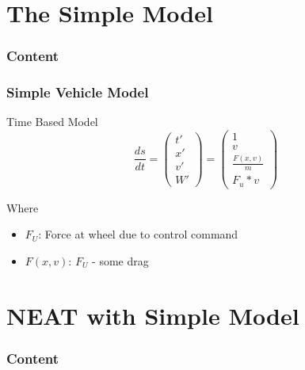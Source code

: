 \documentclass[8pt]{beamer}
\begin{document}
\section{The Simple Model}
\begin{frame}
	\frametitle{Content}
\end{frame}
\begin{frame}
	\frametitle{Simple Vehicle Model}
	\begin{block}{Time Based Model}	
	\[
	\frac{ds}{dt} = \left(
			\begin{array}{ll}
			t' \\
			x' \\
			v' \\
			W'
			\end{array}
		\right)
		= \left(
			\begin{array}{ll}
			1 \\
			v \\
			\frac{F(x,v)}{m} \\
			F_u * v
			\end{array}
		\right)
	\]
	
	Where\\
	\begin{itemize}
		\item $F_U$: Force at wheel due to control command
		\item $F(x,v)$: $F_U$ - some drag
	\end{itemize}
	\end{block}

\end{frame}


\section{NEAT with Simple Model}
\begin{frame}
	\frametitle{Content}
\end{frame}
\end{document}
